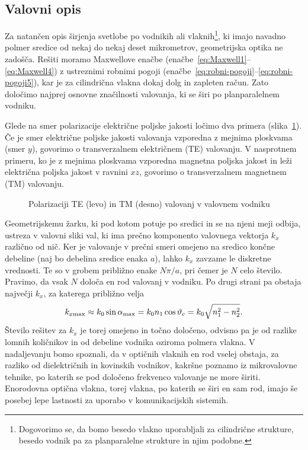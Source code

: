 \subsection*{Valovni opis}
Za natančen opis širjenja svetlobe po vodnikih ali vlaknih\footnote{Dogovorimo se, da bomo 
besedo vlakno uporabljali za cilindrične strukture, besedo vodnik pa za planparalelne 
strukture in njim podobne.}, ki imajo navadno polmer
sredice od nekaj do nekaj deset mikrometrov, geometrijska optika ne
zadošča. Rešiti moramo Maxwellove enačbe (enačbe~\ref{eq:Maxwell1}--\ref{eq:Maxwell4}) 
z ustreznimi robnimi pogoji (enačbe~\ref{eq:robni-pogoji}--\ref{eq:robni-pogoji5}),
kar je za cilindrična vlakna dokaj dolg in zapleten račun. Zato določimo najprej 
osnovne značilnosti valovanja, ki se širi po planparalelnem vodniku.

Glede na smer polarizacije električne poljske jakosti 
ločimo dva primera (slika~\ref{fig:TETM}). Če je smer električne poljske
jakosti valovanja vzporedna z mejnima ploskvama (smer $y$), 
govorimo o transverzalnem električnem (TE) valovanju. 
V nasprotnem primeru, ko je 
z mejnima ploskvama vzporedna magnetna poljska jakost in 
leži električna poljska jakost v ravnini $xz$, 
govorimo o transverzalnem magnetnem (TM) valovanju.
\begin{figure}[h]
\centering
\def\svgwidth{140truemm} 

\caption{Polarizaciji TE (levo) in TM (desno) valovanj v valovnem vodniku}
\label{fig:TETM}
\end{figure}

Geometrijskemu žarku, ki pod kotom potuje po sredici in se na njeni meji
odbija, ustreza v valovni sliki val, ki ima prečno komponento valovnega
vektorja $k_{x}$ različno od nič. Ker je valovanje v prečni smeri 
omejeno na sredico končne debeline (naj bo debelina sredice enaka $a$), lahko
$k_{x}$ zavzame le diskretne vrednosti. Te so v grobem približno enake $N\pi/a$, pri čemer je $N$
celo število. Pravimo, da vsak $N$ določa en rod valovanj v vodniku. Po drugi strani 
pa obstaja največji $k_x$, za katerega približno velja
\begin{equation}
k_{x \mathrm{max}} \approx k_0 \sin\alpha_{\rm max} = 
k_0 n_1 \cos\vartheta_c = k_0 \sqrt{n_1^2 -n_2^2}.
\end{equation}
Število rešitev za $k_x$ je torej omejeno in točno določeno, odvisno
pa je od razlike lomnih količnikov in od debeline vodnika oziroma polmera vlakna. 
V nadaljevanju bomo spoznali, da v optičnih vlaknih en rod vselej obstaja,
za razliko od dielektričnih in kovinskih vodnikov, kakršne
poznamo iz mikrovalovne tehnike, po katerih se pod določeno frekvenco
valovanje ne more širiti. Enorodovna optična vlakna, torej vlakna, po katerih se širi
en sam rod, imajo še posebej lepe lastnosti za uporabo v komunikacijskih
sistemih.

